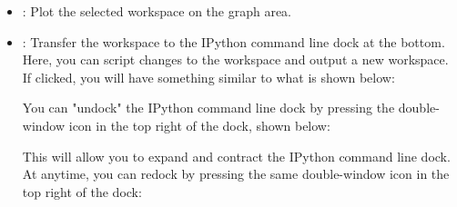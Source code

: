 \begin{itemize}

\item {}: Plot the selected workspace on the graph area.

\item {}: Transfer the workspace to the IPython command line dock at the bottom. Here, you can script changes to the workspace and output a new workspace. If clicked, you will have something similar to what is shown below:

\noindent{}

You can "undock" the IPython command line dock by pressing the double-window icon in the top right of the dock, shown below:

\noindent{} 

This will allow you to expand and contract the IPython command line dock. At anytime, you can redock by pressing the same double-window icon in the top right of the dock:

\noindent{}


\end{itemize}
